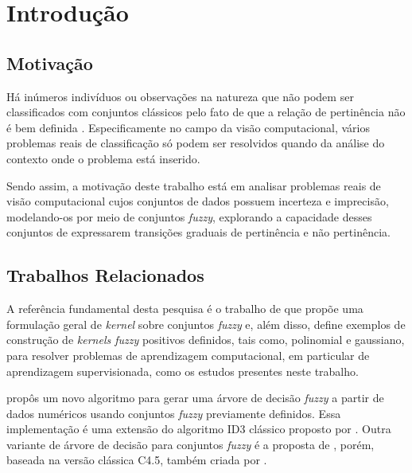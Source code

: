 \chapter{Introdução}
\label{cap:introducao}


\section{Motivação}
\label{sec:consideracoes_preliminares}

Há inúmeros indivíduos ou observações na natureza que não podem ser classificados com conjuntos clássicos pelo fato de que a relação de pertinência não é bem definida \citep{pedrycz:98}. Especificamente no campo da visão computacional, vários problemas reais de classificação só podem ser resolvidos quando da análise do contexto onde o problema está inserido.

Sendo assim, a motivação deste trabalho está em analisar problemas reais de visão computacional cujos conjuntos de dados possuem incerteza e imprecisão, modelando-os por meio de conjuntos \emph{fuzzy}, explorando a capacidade desses conjuntos de expressarem transições graduais de pertinência e não pertinência.
 

\section{Trabalhos Relacionados}
\label{sec:trabalhos_relacionados}

A referência fundamental desta pesquisa é o trabalho de \citet{guevara:14} que propõe uma formulação geral de \emph{kernel} sobre conjuntos \emph{fuzzy} e, além disso, define exemplos de construção de \emph{kernels fuzzy} positivos definidos, tais como, polinomial e gaussiano, para resolver problemas de aprendizagem computacional, em particular de aprendizagem supervisionada, como os estudos presentes neste trabalho.

\citet{umano:94} propôs um novo algoritmo para gerar uma árvore de decisão \emph{fuzzy} a partir de dados numéricos usando conjuntos \emph{fuzzy} previamente definidos. Essa implementação é uma extensão do algoritmo ID3 clássico proposto por \citet{quinlan:86}. Outra variante de árvore de decisão para conjuntos \emph{fuzzy} é a proposta de \citet{cintra:13}, porém, baseada na versão clássica C4.5, também criada por \citet{quinlan:96}.


